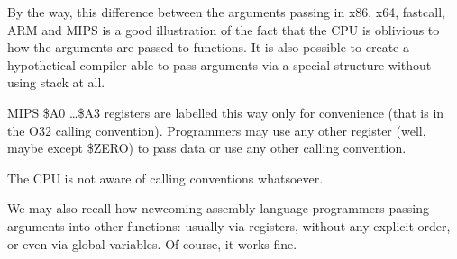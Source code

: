 
By the way, this difference between the arguments passing in x86, x64, 
fastcall, ARM and MIPS is a good illustration of the fact that the CPU is oblivious to how the arguments are passed to functions. 
It is also possible to create a hypothetical compiler able to pass arguments 
via a special structure without using stack at all.

MIPS \$A0 \dots \$A3 registers are labelled this way only for convenience (that is in the O32 calling convention).
Programmers may use any other register (well, maybe except \$ZERO) 
to pass data or use any other calling convention.

The \ac{CPU} is not aware of calling conventions whatsoever.

We may also recall how newcoming assembly language programmers passing arguments into
other functions: usually via registers, without any explicit order, or even via global variables.
Of course, it works fine.

